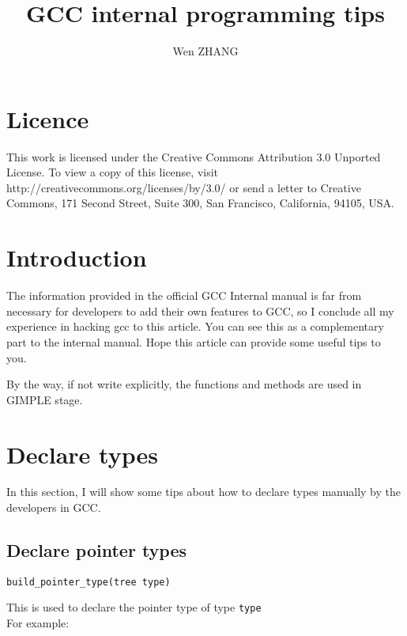 \documentclass[11pt]{article}
\title{GCC internal programming tips}
\author{Wen ZHANG}
\begin{document}
\lstset{
    language=c,
    breaklines=true,
    frame=single,
    tabsize=4,
    basicstyle=\ttfamily\scriptsize
}

\maketitle

\tableofcontents
\pagebreak

\section{Licence}
This work is licensed under the Creative Commons Attribution 3.0 Unported License. To view a copy of this license, visit http://creativecommons.org/licenses/by/3.0/ or send a letter to Creative Commons, 171 Second Street, Suite 300, San Francisco, California, 94105, USA.
\pagebreak

\section{Introduction}
The information provided in the official GCC Internal manual is far from necessary for developers to add their own features to GCC, so I conclude all my experience in hacking gcc to this article. You can see this as a complementary part to the internal manual. Hope this article can provide some useful tips to you.

By the way, if not write explicitly, the functions and methods are used in GIMPLE stage. 

\section{Declare types}
In this section, I will show some tips about how to declare types manually by the developers in GCC.

\subsection{Declare pointer types}
\begin{lstlisting}[mathescape]
build_pointer_type(tree type)
\end{lstlisting}
This is used to declare the pointer type of type \texttt{type} \\
For example:
\end{document}

